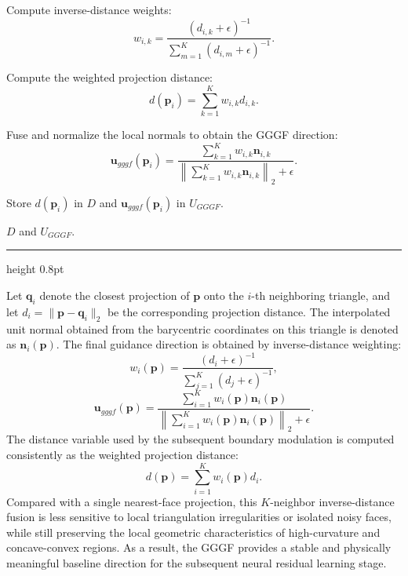 \documentclass[%
 aip,
 amsmath,amssymb,
 reprint,%
nobibnotes,
]{revtex4-1}
\newcounter{algorithm}
\begin{document}
\begin{center}
\begin{minipage}{0.96\columnwidth}
\begin{algorithmic}[1]
            \STATE Compute inverse-distance weights:
            \[
                w_{i,k}
                =
                \frac{(d_{i,k}+\epsilon)^{-1}}
                {\sum_{m=1}^{K}(d_{i,m}+\epsilon)^{-1}} .
            \]

            \STATE Compute the weighted projection distance:
            \[
                d(\mathbf{p}_i)
                =
                \sum_{k=1}^{K}w_{i,k}d_{i,k}.
            \]

            \STATE Fuse and normalize the local normals to obtain the GGGF direction:
            \[
                \mathbf{u}_{gggf}(\mathbf{p}_i)
                =
                \frac{
                \sum_{k=1}^{K}w_{i,k}\mathbf{n}_{i,k}
                }{
                \left\|\sum_{k=1}^{K}w_{i,k}\mathbf{n}_{i,k}\right\|_2+\epsilon
                } .
            \]

            \STATE Store $d(\mathbf{p}_i)$ in $D$ and $\mathbf{u}_{gggf}(\mathbf{p}_i)$ in $U_{GGGF}$.
        \ENDFOR

        \RETURN $D$ and $U_{GGGF}$.
    \end{algorithmic}
    \vspace{0.2em}
    \hrule height 0.8pt
    \end{minipage}
\end{center}


Let $\mathbf{q}_{i}$ denote the closest projection of $\mathbf{p}$ onto the $i$-th neighboring triangle, and let $d_i=\|\mathbf{p}-\mathbf{q}_{i}\|_2$ be the corresponding projection distance. The interpolated unit normal obtained from the barycentric coordinates on this triangle is denoted as $\mathbf{n}_{i}(\mathbf{p})$. The final guidance direction is obtained by inverse-distance weighting:
\begin{equation}
    w_i(\mathbf{p}) =
    \frac{(d_i+\epsilon)^{-1}}
    {\sum_{j=1}^{K}(d_j+\epsilon)^{-1}},
    \label{eq:gggf_weight}
\end{equation}
\begin{equation}
    \mathbf{u}_{gggf}(\mathbf{p}) =
    \frac{\sum_{i=1}^{K} w_i(\mathbf{p}) \mathbf{n}_{i}(\mathbf{p})}
    {\left\|\sum_{i=1}^{K} w_i(\mathbf{p}) \mathbf{n}_{i}(\mathbf{p})\right\|_2+\epsilon}.
    \label{eq:gggf_normal}
\end{equation}
The distance variable used by the subsequent boundary modulation is computed consistently as the weighted projection distance:
\begin{equation}
    d(\mathbf{p}) = \sum_{i=1}^{K} w_i(\mathbf{p}) d_i .
    \label{eq:gggf_distance}
\end{equation}
Compared with a single nearest-face projection, this $K$-neighbor inverse-distance fusion is less sensitive to local triangulation irregularities or isolated noisy faces, while still preserving the local geometric characteristics of high-curvature and concave-convex regions. As a result, the GGGF provides a stable and physically meaningful baseline direction for the subsequent neural residual learning stage.
\end{document}
